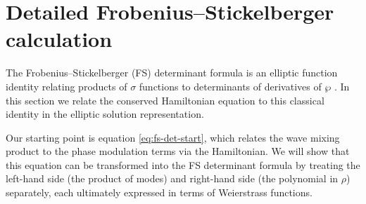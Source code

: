 \documentclass[11pt,a4paper]{article}
\begin{document}
\section{Detailed Frobenius--Stickelberger calculation}
\label{supp:sec:fs-proof}

The Frobenius--Stickelberger (FS) determinant formula is an elliptic function identity relating products of $\sigma$ functions to determinants of derivatives of $\wp$ \cite{whittakerCourseModernAnalysis2021, frobeniusZurTheorieElliptischen1877}.
In this section we relate the conserved Hamiltonian equation to this classical identity in the elliptic solution representation.

Our starting point is equation \eqref{eq:fs-det-start}, which relates the wave mixing product to the phase modulation terms via the Hamiltonian.
We will show that this equation can be transformed into the FS determinant formula by treating the left-hand side (the product of modes) and right-hand side (the polynomial in $\rho$) separately, each ultimately expressed in terms of Weierstrass functions.
\end{document}
